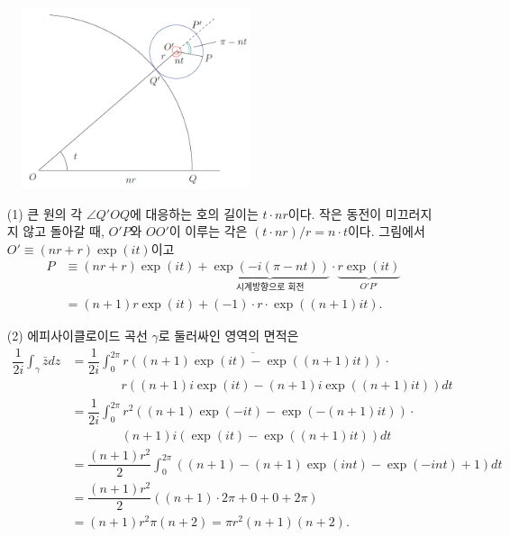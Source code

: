 \begin{figure}[h!]
\begin{center}
\includegraphics[width=0.6\textwidth]{./Solution/figs/fig-s-0-10}
\end{center}
\end{figure}

\begin{itemize}
\item[(1)] 큰 원의 각 $\angle Q'OQ$에 대응하는 호의 길이는 $t\cdot nr$이다.
작은 동전이 미끄러지지 않고 돌아갈 때, $O'P$와 $OO'$이 이루는 각은
$(t\cdot nr)/r = n\cdot t$이다. 그림에서 $O' \equiv (nr+r)\exp(it)$이고
\begin{align*}
P & \equiv (nr+r)\exp(it) + 
\underbrace{\exp(-i(\pi-nt))}_{\text{시계방향으로 회전}}\cdot
\underbrace{r\exp(it)}_{O'P'} \\
&=(n+1)r\exp(it) + (-1)\cdot r\cdot \exp((n+1)it).
\end{align*}
\item[(2)] 에피사이클로이드 곡선 $\gamma$로 둘러싸인 영역의 면적은
 \begin{align*}
\dfrac1{2i} \int_\gamma \bar z dz 
&= \dfrac1{2i}\int_0^{2\pi} \overline{r\left( (n+1)\exp(it)-\exp((n+1)it)\right)}\cdot \\
&\qquad\qquad r\left((n+1)i\exp(it) - (n+1)i\exp((n+1)it)\right)dt \\
&= \dfrac1{2i} \int_0^{2\pi} r^2\left( (n+1)\exp(-it) - \exp(-(n+1)it)\right)\cdot  \\
&\qquad\qquad (n+1)i\left(\exp(it) - \exp((n+1)it)\right)dt \\
&= \dfrac{(n+1)r^2}2 \int_0^{2\pi} ((n+1) -(n+1)\exp(int) - \exp(-int) +1)dt \\
&= \dfrac{(n+1)r^2}2 ((n+1) \cdot 2\pi + 0+0 + 2\pi) \\
&= (n+1)r^2\pi(n+2) = \pi r^2 (n+1)(n+2).
\end{align*}
\end{itemize}

